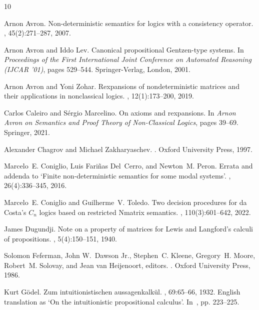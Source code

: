 \documentclass[12pt]{article}
\begin{document}
{}
%
\begin{thebibliography}{10}

Arnon Avron.
\newblock Non-deterministic semantics for logics with a consistency operator.
, 45(2):271--287,
  2007.

Arnon Avron and Iddo Lev.
\newblock Canonical propositional {G}entzen-type systems.
\newblock In {\em Proceedings of the First International Joint Conference on
  Automated Reasoning (IJCAR '01)}, pages 529--544. Springer-Verlag, London,
  2001.

Arnon Avron and Yoni Zohar.
\newblock Rexpansions of nondeterministic matrices and their applications in
  nonclassical logics.
, 12(1):173--200, 2019.

Carlos Caleiro and S{\'e}rgio Marcelino.
\newblock On axioms and rexpansions.
\newblock In {\em Arnon Avron on Semantics and Proof Theory of Non-Classical
  Logics}, pages 39--69. Springer, 2021.

Alexander Chagrov and Michael Zakharyaschev.
.
\newblock Oxford University Press, 1997.

Marcelo~E. Coniglio, Luis Fariñas Del~Cerro, and Newton~M. Peron.
\newblock Errata and addenda to ‘{F}inite non-deterministic semantics for
  some modal systems’.
, 26(4):336--345, 2016.

Marcelo~E. Coniglio and Guilherme~V. Toledo.
\newblock Two decision procedures for da {Costa’s $C_n$} logics based on
  restricted {N}matrix semantics.
, 110(3):601--642, 2022.

James Dugundji.
\newblock Note on a property of matrices for {L}ewis and {L}angford's calculi
  of propositions.
, 5(4):150--151, 1940.

Solomon Feferman, John W.~Dawson Jr., Stephen~C. Kleene, Gregory~H. Moore,
  Robert~M. Solovay, and Jean van Heijenoort, editors.
.
\newblock Oxford University Press, 1986.

Kurt G\"{o}del.
\newblock Zum intuitionistischen aussagenkalk\"{u}l.
, 69:65--66,
  1932.
\newblock English translation as `On the intuitionistic propositional
  calculus'. In~\cite{Feferman:etal:1986}, pp. 223--225.


\end{thebibliography}
\end{document}
